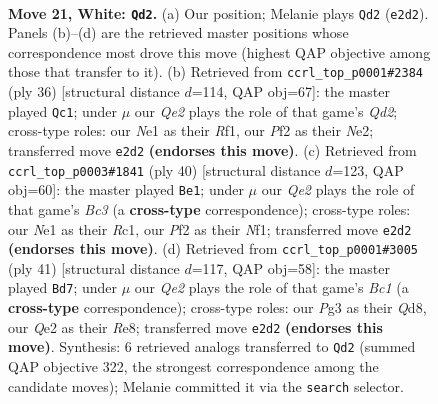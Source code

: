\documentclass[11pt]{article}
\begin{document}
\clearpage

\begin{figure}[p]\centering
\begin{subfigure}{0.46\textwidth}\centering
\resizebox{\linewidth}{!}{%
\newchessgame
\chessboard[
  setfen={2rqr3/4bp1k/2n2n2/p5pp/1p1p4/1P1P2P1/PBR1QP1P/RN2N1K1 w - - 0 21},
  showmover=false,
  pgfstyle=straightmove, color=movearrow, markmove={e2-d2}
]}
\caption{}
\end{subfigure}\hfill
\begin{subfigure}{0.46\textwidth}\centering
\resizebox{\linewidth}{!}{%
\newchessgame
\chessboard[
  setfen={3rqr1k/1p2b1pp/p1n2n2/3pp3/8/1P2P1PP/PB1QNPB1/3R1RK1 w - - 2 19},
  showmover=false,
  pgfstyle=straightmove, color=movearrow, markmove={d2-c1}
]}
\caption{}
\end{subfigure}
\\[4pt]
\begin{subfigure}{0.46\textwidth}\centering
\resizebox{\linewidth}{!}{%
\newchessgame
\chessboard[
  setfen={r3r1k1/3q1pp1/3b1n2/3pp2p/8/pPB1P2P/P3QPP1/2RR1NK1 w - - 0 21},
  showmover=false,
  pgfstyle=straightmove, color=movearrow, markmove={c3-e1}
]}
\caption{}
\end{subfigure}\hfill
\begin{subfigure}{0.46\textwidth}\centering
\resizebox{\linewidth}{!}{%
\newchessgame
\chessboard[
  setfen={r1bqr1k1/2p2pbp/1p1p2n1/3P4/P1P1Pp2/R1N2N1P/3QBPP1/3R2K1 b - - 4 21},
  showmover=false,
  pgfstyle=straightmove, color=movearrow, markmove={c8-d7}
]}
\caption{}
\end{subfigure}
\caption{\textbf{Move 21, White: \texttt{Qd2}.} (a) Our position; Melanie plays \texttt{Qd2} (\texttt{e2d2}). Panels (b)--(d) are the retrieved master positions whose correspondence most drove this move (highest QAP objective among those that transfer to it). (b) Retrieved from \texttt{ccrl\_top\_p0001\#2384} (ply 36) [structural distance $d$=114, QAP obj=67]: the master played \texttt{Qc1}; under $\mu$ our \emph{Qe2} plays the role of that game's \emph{Qd2}; cross-type roles: our \emph{N}e1 as their \emph{R}f1, our \emph{P}f2 as their \emph{N}e2; transferred move \texttt{e2d2} \textbf{(endorses this move)}. (c) Retrieved from \texttt{ccrl\_top\_p0003\#1841} (ply 40) [structural distance $d$=123, QAP obj=60]: the master played \texttt{Be1}; under $\mu$ our \emph{Qe2} plays the role of that game's \emph{Bc3} (a \textbf{cross-type} correspondence); cross-type roles: our \emph{N}e1 as their \emph{R}c1, our \emph{P}f2 as their \emph{N}f1; transferred move \texttt{e2d2} \textbf{(endorses this move)}. (d) Retrieved from \texttt{ccrl\_top\_p0001\#3005} (ply 41) [structural distance $d$=117, QAP obj=58]: the master played \texttt{Bd7}; under $\mu$ our \emph{Qe2} plays the role of that game's \emph{Bc1} (a \textbf{cross-type} correspondence); cross-type roles: our \emph{P}g3 as their \emph{Q}d8, our \emph{Q}e2 as their \emph{R}e8; transferred move \texttt{e2d2} \textbf{(endorses this move)}. Synthesis: 6 retrieved analogs transferred to \texttt{Qd2} (summed QAP objective 322, the strongest correspondence among the candidate moves); Melanie committed it via the \texttt{search} selector.}
\label{fig:thought-m40}
\end{figure}
\end{document}
